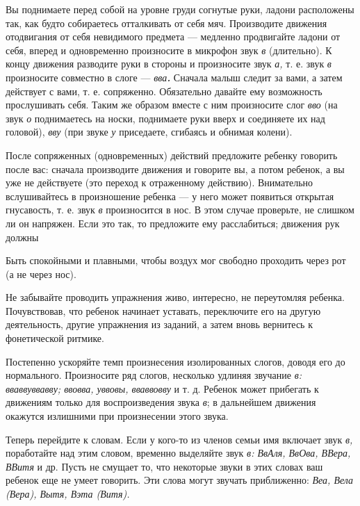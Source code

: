 \documentclass[a5paper]{book}
\renewcommand{\emph}[1]{\textit{#1}}
\begin{document}
Вы поднимаете перед собой на уровне груди согнутые руки, ладони
расположены так, как будто собираетесь отталкивать от себя мяч.
Производите движения отодвигания от себя невидимого предмета ---
медленно продвигайте ладони от себя, вперед и одновременно произносите в
микрофон звук \emph{в} (длительно). К концу движения разводите руки в
стороны и произносите звук \emph{а,} т. е. звук \emph{в} произносите
совместно в слоге --- \emph{вва\textbf{. }}Сначала малыш следит за вами,
а затем действует с вами, т. е. сопряженно. Обязательно давайте ему
возможность прослушивать себя. Таким же образом вместе с ним произносите
слог \emph{вво} (на звук \emph{о} поднимаетесь на носки, поднимаете руки
вверх и соединяете их над головой), \emph{вву} (при звуке \emph{у}
приседаете, сгибаясь и обнимая колени).

После сопряженных (одновременных) действий предложите ребенку говорить
после вас: сначала производите движения и говорите вы, а потом ребенок,
а вы уже не действуете (это переход к отраженному действию). Внимательно
вслушивайтесь в произношение ребенка --- у него может появиться открытая
гнусавость, т. е. звук \emph{в} произносится в нос. В этом случае
проверьте, не слишком ли он напряжен. Если это так, то предложите ему
расслабиться; движения рук должны

Быть спокойными и плавными, чтобы воздух мог свободно проходить через
рот (а не через нос).

Не забывайте проводить упражнения живо, интересно, не переутомляя
ребенка. Почувствовав, что ребенок начинает уставать, переключите его на
другую деятельность, другие упражнения из заданий, а затем вновь
вернитесь к фонетической ритмике.

Постепенно ускоряйте темп произнесения изолированных слогов, доводя его
до нормального. Произносите ряд слогов, несколько удлиняя звучание
\emph{в: вваввуввавву; ввовва, уввовы, вваввовву} и т. д. Ребенок может
прибегать к движениям только для воспроизведения звука \emph{в}; в
дальнейшем движения окажутся излишними при произнесении этого звука.

Теперь перейдите к словам. Если у кого-то из членов семьи имя включает
звук \emph{в,} поработайте над этим словом, временно выделяйте звук
\emph{в: ВвАля, ВвОва, ВВера, ВВитя} и др. Пусть не смущает то, что
некоторые звуки в этих словах ваш ребенок еще не умеет говорить. Эти
слова могут звучать приближенно: \emph{Веа, Вела (Вера), Вытя, Вэта
(Витя).}
\end{document}

